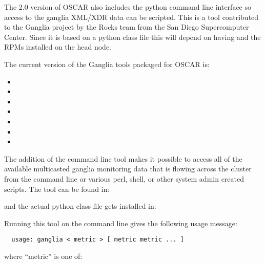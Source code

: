 The 2.0 version of OSCAR also includes the  python
command line interface so access to the ganglia XML/XDR data can be
scripted. This is a tool contributed to the Ganglia project by the
Rocks team from the San Diego Supercomputer Center. Since it is based
on a python class file this will depend on having 
and the  RPMs installed on the head node.

The current version of the Ganglia tools packaged for OSCAR is:

\begin{itemize}
\item {}
\item {}
\item {}
\item {}
\item {}
\item {}
\item {}
\end{itemize}

The addition of the  command line tool makes it possible
to access all of the available multicasted ganglia monitoring data
that is flowing across the cluster from the command line or various
perl, shell, or other system admin created scripts.  The tool can be
found in:

\vspace{10pt}
\centerline{}
\vspace{10pt}

\noindent and the actual python class file gets installed in:

\vspace{10pt}
\centerline{}
\vspace{10pt}

Running this tool on the command line gives the following usage
message:

\begin{verbatim}
  usage: ganglia < metric > [ metric metric ... ]
\end{verbatim}

where ``metric'' is one of:

